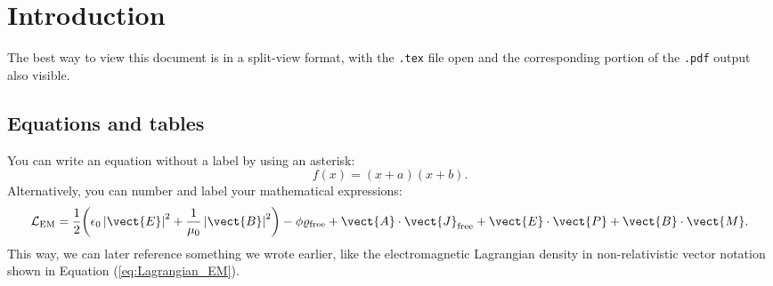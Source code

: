\chapter{Introduction}\label{ch:introduction}

The best way to view this document is in a split-view format, with the \texttt{.tex} file open and the corresponding portion of the \texttt{.pdf} output also visible.

\section{Equations and tables}\label{sec:equationexamples}

You can write an equation without a label by using an asterisk:
\begin{equation*}
f(x) = (x+a)(x+b).
\end{equation*}
Alternatively, you can number and label your mathematical expressions:
\begin{equation}\label{eq:Lagrangian_EM}
\mathcal{L}_{\text{EM}} 
  = \frac{1}{2} \biggl( \epsilon_{0} \left| \vect{E} \right|^{2} + \frac{1}{\mu_{0}} \left| \vect{B} \right|^{2} \biggr)
   - \phi \varrho_{\text{free}} + \vect{A} \cdot \vect{J}_{\text{free}}
   + \vect{E} \cdot \vect{P} + \vect{B} \cdot \vect{M}.
\end{equation}
This way, we can later reference something we wrote earlier, like the electromagnetic Lagrangian density in non-relativistic vector notation shown in Equation (\ref{eq:Lagrangian_EM}).\\


